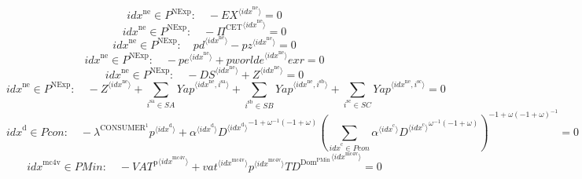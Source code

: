 \begin{equation}
{i\!d\!x}^{\mathrm{ne}}\in P^{\mathrm{NExp}}\colon\quad -{{E\!X}}^{\langle {i\!d\!x}^{\mathrm{ne}}\rangle} = 0
\end{equation}
\begin{equation}
{i\!d\!x}^{\mathrm{ne}}\in P^{\mathrm{NExp}}\colon\quad -{\Pi^{\mathrm{CET}}}^{\langle {i\!d\!x}^{\mathrm{ne}}\rangle} = 0
\end{equation}
\begin{equation}
{i\!d\!x}^{\mathrm{ne}}\in P^{\mathrm{NExp}}\colon\quad {{p\!d}}^{\langle {i\!d\!x}^{\mathrm{ne}}\rangle} - {{p\!z}}^{\langle {i\!d\!x}^{\mathrm{ne}}\rangle} = 0
\end{equation}
\begin{equation}
{i\!d\!x}^{\mathrm{ne}}\in P^{\mathrm{NExp}}\colon\quad -{{p\!e}}^{\langle {i\!d\!x}^{\mathrm{ne}}\rangle} + {{{p\!w\!o\!r\!l\!d\!e}}^{\langle {i\!d\!x}^{\mathrm{ne}}\rangle}} {{e\!x\!r}} = 0
\end{equation}
\begin{equation}
{i\!d\!x}^{\mathrm{ne}}\in P^{\mathrm{NExp}}\colon\quad -{{D\!S}}^{\langle {i\!d\!x}^{\mathrm{ne}}\rangle} + {Z}^{\langle {i\!d\!x}^{\mathrm{ne}}\rangle} = 0
\end{equation}
\begin{equation}
{i\!d\!x}^{\mathrm{ne}}\in P^{\mathrm{NExp}}\colon\quad -{Z}^{\langle {i\!d\!x}^{\mathrm{ne}}\rangle} + \sum_{i^{\mathrm{sa}}\in {S\!A}} {{Y\!a\!p}}^{\langle {i\!d\!x}^{\mathrm{ne}},i^{\mathrm{sa}}\rangle} + \sum_{i^{\mathrm{sb}}\in {S\!B}} {{Y\!a\!p}}^{\langle {i\!d\!x}^{\mathrm{ne}},i^{\mathrm{sb}}\rangle} + \sum_{i^{\mathrm{sc}}\in {S\!C}} {{Y\!a\!p}}^{\langle {i\!d\!x}^{\mathrm{ne}},i^{\mathrm{sc}}\rangle} = 0
\end{equation}
\begin{equation}
{i\!d\!x}^{\mathrm{d}}\in {P\!c\!o\!n}\colon\quad -{\lambda^{\mathrm{CONSUMER}^{\mathrm{1}}}} {{p}^{\langle {i\!d\!x}^{\mathrm{d}}\rangle}} + {{\alpha}^{\langle {i\!d\!x}^{\mathrm{d}}\rangle}} {{{D}^{\langle {i\!d\!x}^{\mathrm{d}}\rangle}}^{-1 + {\omega}^{-1} \left(-1 + \omega\right)}} {\left(\sum_{{i\!d\!x}^{\mathrm{c}}\in {P\!c\!o\!n}} {{\alpha}^{\langle {i\!d\!x}^{\mathrm{c}}\rangle}} {{{D}^{\langle {i\!d\!x}^{\mathrm{c}}\rangle}}^{{\omega}^{-1} \left(-1 + \omega\right)}}\right)^{-1 + {\omega} \left(-1 + \omega\right)^{-1}}} = 0
\end{equation}
\begin{equation}
{i\!d\!x}^{\mathrm{mc4v}}\in {P\!M\!i\!n}\colon\quad -{{V\!A\!T}^{\mathrm{p}}}^{\langle {i\!d\!x}^{\mathrm{mc4v}}\rangle} + {{{v\!a\!t}}^{\langle {i\!d\!x}^{\mathrm{mc4v}}\rangle}} {{p}^{\langle {i\!d\!x}^{\mathrm{mc4v}}\rangle}} {{{T\!D}^{\mathrm{Dom}^{\mathrm{PMin}}}}^{\langle {i\!d\!x}^{\mathrm{mc4v}}\rangle}} = 0
\end{equation}
